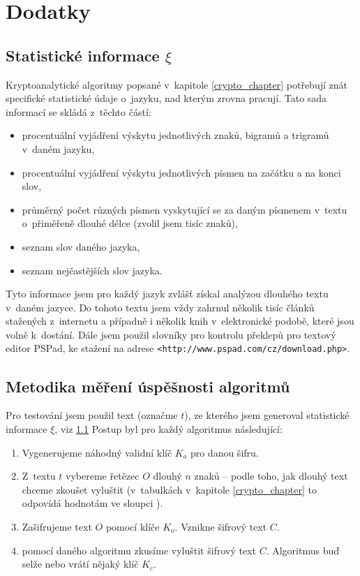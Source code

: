 \documentclass[12pt]{article}
\theoremstyle{definition}
\newcommand{\stats}{\xi}
\begin{document}
\section{Dodatky}
\subsection{Statistické informace $\stats$}
\label{stats}
Kryptoanalytické algoritmy popsané v~kapitole \ref{crypto_chapter} potřebují znát specifické statistické údaje o~jazyku, nad kterým zrovna pracují. Tato sada informací se skládá z~těchto částí: 

\begin{itemize}
\item procentuální vyjádření výskytu jednotlivých znaků, bigramů a trigramů v~daném jazyku,
\item procentuální vyjádření výskytu jednotlivých písmen na začátku a na konci slov,
\item průměrný počet různých písmen vyskytující se za daným písmenem v~textu o~přiměřeně dlouhé délce (zvolil jsem tisíc znaků),
\item seznam  slov daného jazyka,
\item seznam nejčastějších slov jazyka.
\end{itemize}

Tyto informace jsem pro každý jazyk zvlášť získal analýzou dlouhého textu v~daném jazyce. Do tohoto textu jsem vždy zahrnul několik tisíc článků stažených z~internetu a případně i několik knih v~elektronické podobě, které jsou volně k~dostání. Dále jsem použil slovníky pro kontrolu překlepů pro textový editor PSPad, ke stažení na adrese \texttt{<http://www.pspad.com/cz/download.php>}.

\subsection{Metodika měření úspěšnosti algoritmů}
\label{metodika}
Pro testování jsem použil text (označme $t$), ze kterého jsem generoval statistické informace $\stats$, viz \ref{stats} Postup byl pro každý algoritmus následující:

\begin{enumerate}
\item Vygenerujeme náhodný validní klíč $K_o$ pro danou šifru.
\item Z~textu $t$ vybereme řetězec $O$ dlouhý $n$ znaků -- podle toho, jak dlouhý text chceme zkoušet vyluštit (v~tabulkách v~kapitole \ref{crypto_chapter} to odpovídá hodnotám ve sloupci ).
\item Zašifrujeme text $O$ pomocí klíče $K_o$. Vznikne šifrový text $C$.
\item pomocí daného algoritmu zkusíme vyluštit šifrový text $C$. Algoritmus buď selže nebo vrátí nějaký klíč $K_c$.
\end{enumerate}
\end{document}
